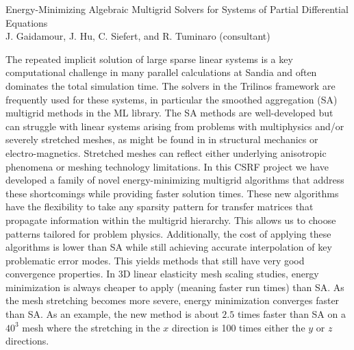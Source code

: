 \documentclass{article}
\begin{document}
\begin{centering}
{\large Energy-Minimizing Algebraic Multigrid Solvers for Systems of Partial Differential Equations}\\
\vskip 0.1in
J. Gaidamour, J. Hu, C. Siefert, and R. Tuminaro (consultant)\\
\vskip 0.1in
\end{centering}
%
The repeated implicit solution of large sparse linear systems is a key computational challenge
in many parallel calculations at Sandia and often dominates the total simulation time.  The solvers in the Trilinos framework are frequently used
for these systems, in particular the smoothed aggregation (SA) multigrid
methods in the ML library.
The SA methods are well-developed but can struggle with linear systems arising
from problems with multiphysics and/or severely stretched meshes, as might be found in in structural mechanics
or electro-magnetics.  Stretched meshes can reflect either underlying anisotropic phenomena or meshing
technology limitations.
In this CSRF project we have developed a family of novel
energy-minimizing multigrid algorithms  that address these shortcomings
while providing faster solution times.
These new algorithms have the flexibility to take any sparsity pattern for transfer
matrices that propagate information within the multigrid hierarchy.  This allows us to choose patterns
tailored for problem physics.
Additionally, the cost of applying these algorithms is lower than SA 
while still achieving accurate interpolation of key problematic error modes.
This yields methods that still have very good convergence properties.
In 3D linear elasticity mesh scaling studies,
energy minimization is always cheaper to apply (meaning faster run times) than SA.  As the mesh stretching
becomes more severe, energy minimization converges faster than SA. 
As an example, the new method is about $2.5$ times faster than SA
on a $40^3$ mesh where the stretching in the $x$ direction is 100 times either the $y$ or
$z$ directions.
\end{document}
